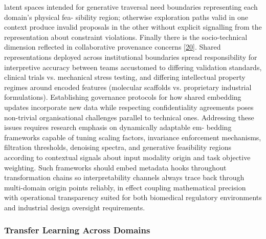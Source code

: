 \documentclass[
]{article}
\begin{document}
latent spaces intended for generative traversal need boundaries
representing each domain's physical fea- sibility region; otherwise
exploration paths valid in one context produce invalid proposals in the
other without explicit signalling from the representation about
constraint violations. Finally there is the socio-technical dimension
reflected in collaborative provenance concerns
{[}\protect\hyperlink{_bookmark60}{20}{]}. Shared representations
deployed across institutional boundaries spread responsibility for
interpretive accuracy between teams accustomed to differing validation
standards, clinical trials vs. mechanical stress testing, and differing
intellectual property regimes around encoded features (molecular
scaffolds vs. proprietary industrial formulations). Establishing
governance protocols for how shared embedding updates incorporate new
data while respecting confidentiality agreements poses non-trivial
organisational challenges parallel to technical ones. Addressing these
issues requires research emphasis on dynamically adaptable em- bedding
frameworks capable of tuning scaling factors, invariance enforcement
mechanisms, filtration thresholds, denoising spectra, and generative
feasibility regions according to contextual signals about input modality
origin and task objective weighting. Such frameworks should embed
metadata hooks throughout transformation chains so interpretability
channels always trace back through multi-domain origin points reliably,
in effect coupling mathematical precision with operational transparency
suited for both biomedical regulatory environments and industrial design
oversight requirements.

\hypertarget{transfer-learning-across-domains}{%
\subsubsection{Transfer Learning Across
Domains}\label{transfer-learning-across-domains}}
\end{document}
